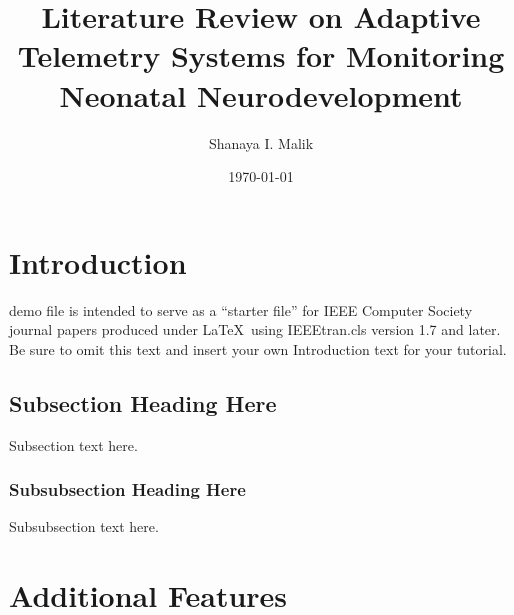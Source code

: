 \documentclass[12pt,journal,compsoc]{IEEEtran}
\begin{document}
\title{Literature Review on Adaptive Telemetry Systems for Monitoring Neonatal Neurodevelopment}
\author{Shanaya I. Malik}


\date{\today}

%


\maketitle

\section{Introduction}

 demo file is intended to serve as a ``starter file''
for IEEE Computer Society journal papers produced under \LaTeX\ using
IEEEtran.cls version 1.7 and later.
Be sure to omit this text and insert your own Introduction text for your tutorial.

\subsection{Subsection Heading Here}
Subsection text here.


\subsubsection{Subsubsection Heading Here}
Subsubsection text here.



\section{Additional Features}
\end{document}

